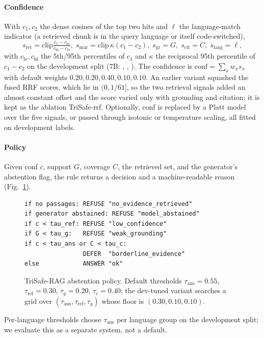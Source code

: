 \paragraph{Confidence} With $c_1,c_2$ the dense cosines of the top two hits and $\ell$ the language-match indicator (a retrieved chunk is in the query language or itself code-switched),
\begin{equation}
  s_{\mathrm{ret}}=\mathrm{clip}\tfrac{c_1-c_{\mathrm{lo}}}{c_{\mathrm{hi}}-c_{\mathrm{lo}}},\;
  s_{\mathrm{mar}}=\mathrm{clip}\,\kappa(c_1-c_2),\;
  s_{\mathrm{gr}}=G,\; s_{\mathrm{cit}}=C,\; s_{\mathrm{lang}}=\ell,
\end{equation}
with $c_{\mathrm{lo}},c_{\mathrm{hi}}$ the 5th/95th percentiles of $c_1$ and $\kappa$ the reciprocal 95th percentile of $c_1-c_2$ on the development split (7B: \LRetLo, \LRetHi, \LMarScale). The confidence is $\mathrm{conf}=\sum_x w_x s_x$ with default weights $0.20,0.20,0.40,0.10,0.10$. An earlier variant squashed the fused RRF scores, which lie in $(0,1/61]$, so the two retrieval signals added an almost constant offset and the score varied only with grounding and citation; it is kept as the ablation TriSafe-rrf. Optionally, conf is replaced by a Platt model over the five signals, or passed through isotonic or temperature scaling, all fitted on development labels.

\paragraph{Policy} Given conf $c$, support $G$, coverage $C$, the retrieved set, and the generator's abstention flag, the rule returns a decision and a machine-readable reason (Fig.~\ref{fig:policy}).
\begin{figure}[t]
\begin{small}
\begin{verbatim}
if no passages: REFUSE "no_evidence_retrieved"
if generator abstained: REFUSE "model_abstained"
if c < tau_ref: REFUSE "low_confidence"
if G < tau_g:   REFUSE "weak_grounding"
if c < tau_ans or C < tau_c:
                DEFER  "borderline_evidence"
else            ANSWER "ok"
\end{verbatim}
\end{small}
\caption{TriSafe-RAG abstention policy. Default thresholds $\tau_{\mathrm{ans}}{=}0.55$, $\tau_{\mathrm{ref}}{=}0.30$, $\tau_g{=}0.20$, $\tau_c{=}0.40$; the dev-tuned variant searches a grid over $(\tau_{\mathrm{ans}},\tau_{\mathrm{ref}},\tau_g)$ whose floor is $(0.30,0.10,0.10)$.}
\label{fig:policy}
\end{figure}
Per-language thresholds choose $\tau_{\mathrm{ans}}$ per language group on the development split; we evaluate this as a separate system, not a default.

